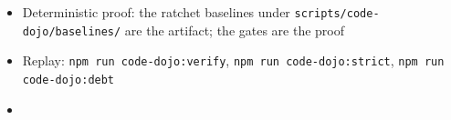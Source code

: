 \begin{itemize}
\tightlist
\item
  Deterministic proof: the ratchet baselines under \texttt{s\allowbreak{}c\allowbreak{}r\allowbreak{}i\allowbreak{}p\allowbreak{}t\allowbreak{}s\allowbreak{}/\allowbreak{}c\allowbreak{}o\allowbreak{}d\allowbreak{}e\allowbreak{}-\allowbreak{}d\allowbreak{}o\allowbreak{}j\allowbreak{}o\allowbreak{}/\allowbreak{}b\allowbreak{}a\allowbreak{}s\allowbreak{}e\allowbreak{}l\allowbreak{}i\allowbreak{}n\allowbreak{}e\allowbreak{}s\allowbreak{}/} are the artifact; the gates are the proof
\item
  Replay: \texttt{n\allowbreak{}p\allowbreak{}m\allowbreak{} \allowbreak{}r\allowbreak{}u\allowbreak{}n\allowbreak{} \allowbreak{}c\allowbreak{}o\allowbreak{}d\allowbreak{}e\allowbreak{}-\allowbreak{}d\allowbreak{}o\allowbreak{}j\allowbreak{}o\allowbreak{}:\allowbreak{}v\allowbreak{}e\allowbreak{}r\allowbreak{}i\allowbreak{}f\allowbreak{}y}, \texttt{n\allowbreak{}p\allowbreak{}m\allowbreak{} \allowbreak{}r\allowbreak{}u\allowbreak{}n\allowbreak{} \allowbreak{}c\allowbreak{}o\allowbreak{}d\allowbreak{}e\allowbreak{}-\allowbreak{}d\allowbreak{}o\allowbreak{}j\allowbreak{}o\allowbreak{}:\allowbreak{}s\allowbreak{}t\allowbreak{}r\allowbreak{}i\allowbreak{}c\allowbreak{}t}, \texttt{n\allowbreak{}p\allowbreak{}m\allowbreak{} \allowbreak{}r\allowbreak{}u\allowbreak{}n\allowbreak{} \allowbreak{}c\allowbreak{}o\allowbreak{}d\allowbreak{}e\allowbreak{}-\allowbreak{}d\allowbreak{}o\allowbreak{}j\allowbreak{}o\allowbreak{}:\allowbreak{}d\allowbreak{}e\allowbreak{}b\allowbreak{}t}
\item

\end{itemize}
